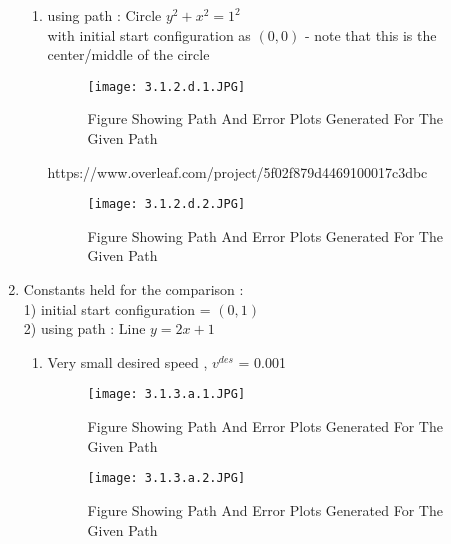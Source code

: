 \documentclass{article}
\begin{document}
\begin{enumerate}
\begin{enumerate}
            \item 
             using path :  Circle $ y^2 + x^2  = 1^2$ \\ 
             with initial start configuration as $(0,0)$ - note that this is the center/middle of the circle
               \renewcommand{\thefigure}{3.1.2.d.1}
                \begin{center}
                    \begin{figure}[H]
                        \centering
                        \texttt{[image: 3.1.2.d.1.JPG]}
                         \caption{Figure Showing Path And Error Plots Generated For The Given Path}
                    \end{figure}
https://www.overleaf.com/project/5f02f879d4469100017c3dbc                \end{center}
                 \renewcommand{\thefigure}{3.1.2.d.2}
                \begin{center}
                    \begin{figure}[H]
                        \centering
                        \texttt{[image: 3.1.2.d.2.JPG]}
                         \caption{Figure Showing Path And Error Plots Generated For The Given Path}
                    \end{figure}
                \end{center}
            
        
        \end{enumerate}
    
    \item 
    Constants held for the comparison : \\ 
    1) initial start configuration  = $(0,1)$ \\
    2)  using path :  Line $ y = 2x + 1$ \\ 
    
    \begin{enumerate} 
        \item
            Very small desired speed , $v^{des}$ =  0.001 
             \renewcommand{\thefigure}{3.1.3.a.1}
                \begin{center}
                    \begin{figure}[H]
                        \centering
                        \texttt{[image: 3.1.3.a.1.JPG]}
                         \caption{Figure Showing Path And Error Plots Generated For The Given Path}
                    \end{figure}
                \end{center}
                 \renewcommand{\thefigure}{3.1.3.a.2}
                \begin{center}
                    \begin{figure}[H]
                        \centering
                        \texttt{[image: 3.1.3.a.2.JPG]}
                         \caption{Figure Showing Path And Error Plots Generated For The Given Path}
                    \end{figure}
                \end{center}
            

\end{enumerate}
\end{enumerate}
\end{document}
